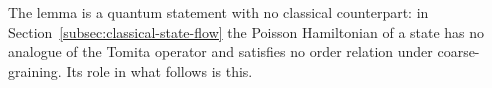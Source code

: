 \documentclass[a4paper,11pt]{article}
\theoremstyle{definition}
\newcommand{\mN}{\mathcal{N}}
\newcommand{\mM}{\mathcal{M}}
\begin{document}
The lemma is a quantum statement with no classical counterpart: in Section~\ref{subsec:classical-state-flow} the Poisson Hamiltonian of a state has no analogue of the Tomita operator and satisfies no order relation under coarse-graining. Its role in what follows is this. 
\end{document}

